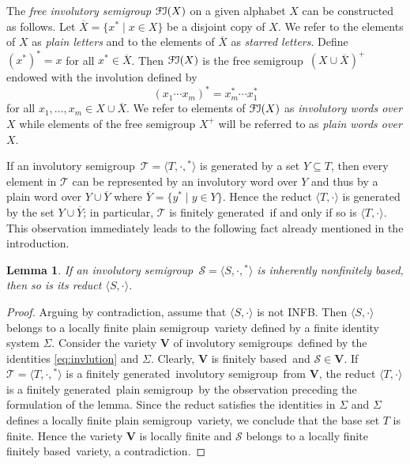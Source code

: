 \documentclass[smallextended]{svjour3}
\newcommand{\sgp}{semi\-group}
\newcommand{\is}{involutory semi\-group}
\newcommand{\iss}{involutory semi\-groups}
\newcommand{\fb}{finitely based}
\newcommand{\fg}{finitely generated}
\newcommand{\infb}{inherently non\-finitely based}
\newcommand{\FI}{\ensuremath{\mathcal{F\kern-.3pt I}}}
\newtheorem{Lemma}[Thm]{Lemma}
\begin{document}
The \emph{free \is} $\FI(X)$ on a given alphabet $X$ can be constructed as follows.  Let $\overline{X}=\{x^*\mid x\in X\}$ be a disjoint
copy of $X$. We refer to the elements of $X$ as \emph{plain letters} and to the elements of $\overline{X}$ as \emph{starred letters}.
Define $(x^*)^*=x$ for all $x^*\in \overline{X}$. Then $\FI(X)$ is the free \sgp\ $(X\cup\overline{X})^+$ endowed with the involution
defined by
$$(x_1\cdots x_m)^* = x_m^*\cdots x_1^*$$
for all $x_1,\dots,x_m\in X\cup \overline{X}$. We refer to elements of $\FI(X)$ as \emph{involutory words over $X$} while elements of the
free semigroup $X^+$ will be referred to as \emph{plain words over $X$}.

If an \is\ $\mathcal{T}=\langle T,\cdot,{}^*\rangle$ is generated by a set $Y\subseteq T$, then every element in $\mathcal{T}$ can be
represented by an involutory word over $Y$ and thus by a plain word over $Y\cup\overline{Y}$ where $\overline{Y}=\{y^*\mid y\in Y\}$. Hence
the reduct $\langle T,\cdot\rangle$ is generated by the set $Y\cup\overline{Y}$; in particular, $\mathcal{T}$ is \fg\ if and only if so is
$\langle T,\cdot\rangle$. This observation immediately leads to the following fact already mentioned in the introduction.

\begin{Lemma}
\label{easy} If an \is\ $\mathcal{S}=\langle S,\cdot,{}^*\rangle$ is \infb, then so is its reduct $\langle S,\cdot\rangle$.
\end{Lemma}

\begin{proof}
Arguing by contradiction, assume that $\langle S,\cdot\rangle$ is not INFB. Then $\langle S,\cdot\rangle$ belongs to a locally finite plain
\sgp\ variety defined by a finite identity system $\Sigma$. Consider the variety $\mathbf{V}$ of \iss\ defined by the identities
\eqref{eq:invlution} and $\Sigma$. Clearly, $\mathbf{V}$ is \fb\ and $\mathcal{S}\in\mathbf{V}$. If $\mathcal{T}=\langle
T,\cdot,{}^*\rangle$ is a \fg\ \is\ from $\mathbf{V}$, the reduct $\langle T,\cdot\rangle$ is a \fg\ plain \sgp\ by the observation
preceding the formulation of the lemma. Since the reduct satisfies the identities in $\Sigma$ and $\Sigma$ defines a locally finite plain
\sgp\ variety, we conclude that the base set $T$ is finite. Hence the variety $\mathbf{V}$ is locally finite and $\mathcal{S}$ belongs to a
locally finite \fb\ variety, a contradiction.
\end{proof}
\end{document}
